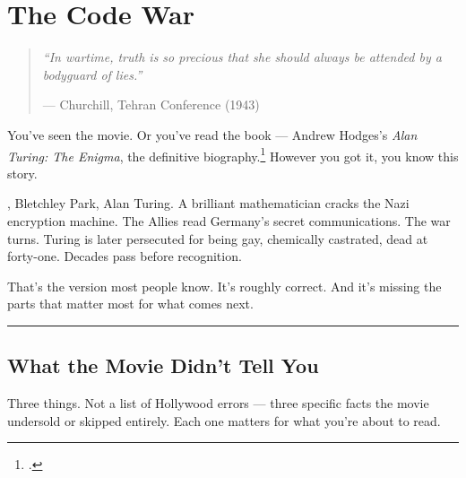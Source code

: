 
\chapter{The Code War}
\label{spine:code-war}

\begin{quote}\small\textit{%
``In wartime, truth is so precious that she should always be attended by a bodyguard of lies.''%
}\par\raggedleft --- Churchill, Tehran Conference (1943)\end{quote}

\vspace{0.5cm}


You've seen the movie. Or you've read the book --- Andrew Hodges's \textit{Alan Turing: The Enigma}, the definitive biography.\footcite{hodges1983} However you got it, you know this story.%

, Bletchley Park, Alan Turing. A brilliant mathematician cracks the Nazi encryption machine. The Allies read Germany's secret communications. The war turns. Turing is later persecuted for being gay, chemically castrated, dead at forty-one. Decades pass before recognition.

That's the version most people know. It's roughly correct. And it's missing the parts that matter most for what comes next.

\vspace{1cm}\noindent\rule{0.5\textwidth}{0.5pt}\vspace{0.5cm}

\section*{What the Movie Didn't Tell You}
\label{spine:cw-what-the-movie-didnt-tell-you}

Three things. Not a list of Hollywood errors --- three specific facts the movie undersold or skipped entirely. Each one matters for what you're about to read.

